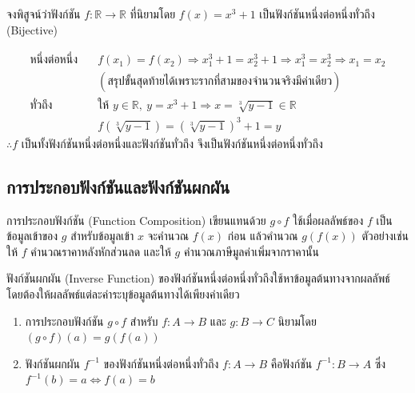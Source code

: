 \begin{ex}
\label{ex:proof-bijective-real}
จงพิสูจน์ว่าฟังก์ชัน $f:\mathbb{R} \to \mathbb{R}$ ที่นิยามโดย $f(x) = x^3 + 1$ เป็นฟังก์ชันหนึ่งต่อหนึ่งทั่วถึง (Bijective)
\end{ex}
\begin{solution}
\begin{align*}
\text{หนึ่งต่อหนึ่ง} &\quad f(x_1) = f(x_2) \Rightarrow x_1^3 + 1 = x_2^3 + 1 \Rightarrow x_1^3 = x_2^3 \Rightarrow x_1 = x_2\\
&\quad (\text{สรุปขั้นสุดท้ายได้เพราะรากที่สามของจำนวนจริงมีค่าเดียว})\\
\text{ทั่วถึง} &\quad \text{ให้ } y \in \mathbb{R},\ y = x^3 + 1 \Rightarrow x = \sqrt[3]{y-1} \in \mathbb{R}\\
&\quad f(\sqrt[3]{y-1}) = (\sqrt[3]{y-1})^3 + 1 = y
\end{align*}
$\therefore f$ เป็นทั้งฟังก์ชันหนึ่งต่อหนึ่งและฟังก์ชันทั่วถึง จึงเป็นฟังก์ชันหนึ่งต่อหนึ่งทั่วถึง \solhere
\end{solution}

\subsection{การประกอบฟังก์ชันและฟังก์ชันผกผัน}
\label{sec:function-composition}

การประกอบฟังก์ชัน (Function Composition) เขียนแทนด้วย $g \circ f$ ใช้เมื่อผลลัพธ์ของ $f$ เป็นข้อมูลเข้าของ $g$ สำหรับข้อมูลเข้า $x$ จะคำนวณ $f(x)$ ก่อน แล้วคำนวณ $g(f(x))$ ตัวอย่างเช่น ให้ $f$ คำนวณราคาหลังหักส่วนลด และให้ $g$ คำนวณภาษีมูลค่าเพิ่มจากราคานั้น~\parencite{grimaldi2004discrete}

ฟังก์ชันผกผัน (Inverse Function) ของฟังก์ชันหนึ่งต่อหนึ่งทั่วถึงใช้หาข้อมูลต้นทางจากผลลัพธ์ โดยต้องให้ผลลัพธ์แต่ละค่าระบุข้อมูลต้นทางได้เพียงค่าเดียว

\begin{definition}
\begin{enumerate}[label=\textbf{\arabic*.}]
    \item การประกอบฟังก์ชัน $g \circ f$ สำหรับ $f:A \to B$ และ $g:B \to C$ นิยามโดย $(g \circ f)(a) = g(f(a))$
    \item ฟังก์ชันผกผัน $f^{-1}$ ของฟังก์ชันหนึ่งต่อหนึ่งทั่วถึง $f:A \to B$ คือฟังก์ชัน $f^{-1}:B \to A$ ซึ่ง $f^{-1}(b) = a \iff f(a) = b$
\end{enumerate}
\end{definition}


